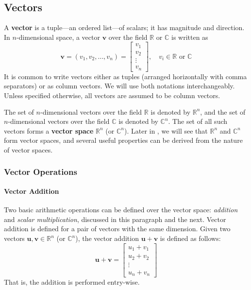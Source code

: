 \subsection{Vectors}
A \textbf{vector} is a tuple---an ordered list---of scalars; it has magnitude and direction. In $ n $-dimensional space, a vector $ \mathbf{v} $ over the field $ \mathbb{R} $ or $ \mathbb{C} $ is written as
\begin{equation*}
    \mathbf{v} = (v_1, v_2, \ldots, v_n) = \begin{bmatrix} v_1 \\ v_2 \\ \vdots \\ v_n \end{bmatrix}, \quad v_i \in \mathbb{R} \text{ or } \mathbb{C}
\end{equation*}
It is common to write vectors either as tuples (arranged horizontally with comma separators) or as column vectors. We will use both notations interchangeably.
Unless specified otherwise, all vectors are assumed to be column vectors.

The set of $n$-dimensional vectors over the field $ \mathbb{R} $ is denoted by $ \mathbb{R}^n $, and the set of $n$-dimensional vectors over the field $ \mathbb{C} $ is denoted by $ \mathbb{C}^n $.
The set of all such vectors forms a \textbf{vector space} $ \mathbb{R}^n $ (or $ \mathbb{C}^n $).
Later in , we will see that $\mathbb{R}^n$ and $\mathbb{C}^n$ form vector spaces, and several useful properties can be derived from the nature of vector spaces.

\subsubsection{Vector Operations}
\paragraph*{Vector Addition}
Two basic arithmetic operations can be defined over the vector space: \emph{addition} and \emph{scalar multiplication}, discussed in this paragraph and the next.
Vector addition is defined for a pair of vectors with the same dimension.
Given two vectors $ \mathbf{u}, \mathbf{v} \in \mathbb{R}^n $ (or $ \mathbb{C}^n $), the vector addition $ \mathbf{u} + \mathbf{v} $ is defined as follows:
\begin{equation*}
  \mathbf{u} + \mathbf{v} = \begin{bmatrix} u_1 + v_1 \\ u_2 + v_2 \\ \vdots \\ u_n + v_n \end{bmatrix}
\end{equation*}
That is, the addition is performed entry-wise.

